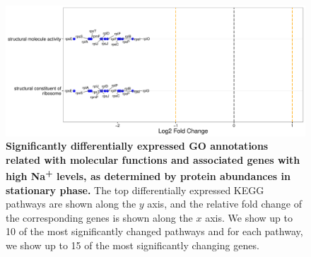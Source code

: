 \documentclass[a4paper]{article}
\begin{document}
\clearpage
\begin{figure}
	\includegraphics[width=1.0\textwidth]{../../d_figures/mf_n_05.pdf}
	\caption[Significantly differentially expressed GO annotations associated with molecular functions for protein samples in stationary phase tested for high Na\textsuperscript{+} against base Na\textsuperscript{+}]
	{\textbf{Significantly differentially expressed GO annotations related with molecular functions and associated genes with high Na\textsuperscript{+} levels, as determined by protein abundances in stationary phase.} The top differentially expressed KEGG pathways are shown along the $y$ axis, and the relative fold change of the corresponding genes is shown along the $x$ axis. We show up to 10 of the most significantly changed pathways and for each pathway, we show up to 15 of the most significantly changing genes.}
\end{figure}
\end{document}
